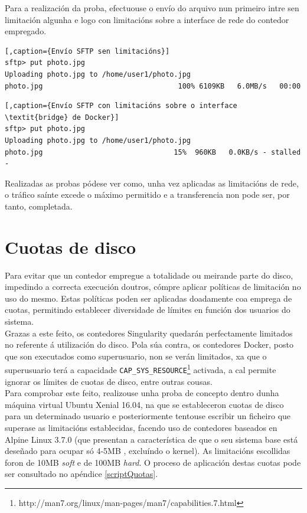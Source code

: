 Para a realización da proba, efectuouse o envío do arquivo nun primeiro intre sen limitación algunha e logo con limitacións sobre a interface de rede do contedor empregado.\\

\begin{lstlisting}[,caption={Envío SFTP sen limitacións}]
sftp> put photo.jpg 
Uploading photo.jpg to /home/user1/photo.jpg
photo.jpg                                100% 6109KB   6.0MB/s   00:00 
\end{lstlisting}

\begin{lstlisting}[,caption={Envío SFTP con limitacións sobre o interface \textit{bridge} de Docker}]
sftp> put photo.jpg
Uploading photo.jpg to /home/user1/photo.jpg
photo.jpg                               15%  960KB   0.0KB/s - stalled -
\end{lstlisting}

Realizadas as probas pódese ver como, unha vez aplicadas as limitacións de rede, o tráfico saínte excede o máximo permitido e a transferencia non pode ser, por tanto, completada.

\section{Cuotas de disco}
\label{quotas}

Para evitar que un contedor empregue a totalidade ou meirande parte do disco, impedindo a correcta execución doutros, cómpre aplicar políticas de limitación no uso do mesmo. Estas políticas poden ser aplicadas doadamente coa emprega de cuotas, permitindo establecer diversidade de límites en función dos usuarios do sistema.\\

Grazas a este feito, os contedores Singularity quedarán perfectamente limitados no referente á utilización do disco. Pola súa contra, os contedores Docker, posto que son executados como superusuario, non se verán limitados, xa que o superusuario terá a capacidade {\tt CAP\_SYS\_RESOURCE}\footnote{http://man7.org/linux/man-pages/man7/capabilities.7.html} activada, a cal permite ignorar os límites de cuotas de disco, entre outras cousas.\\

Para comprobar este feito, realizouse unha proba de concepto dentro dunha máquina virtual Ubuntu Xenial 16.04, na que se estableceron cuotas de disco para un determinado usuario e posteriormente tentouse escribir un ficheiro que superase as limitacións establecidas, facendo uso de contedores baseados en Alpine Linux 3.7.0 (que presentan a característica de que o seu sistema base está deseñado para ocupar só 4-5MB , excluíndo o kernel). As limitacións escollidas foron de 10MB \textit{soft} e de 100MB \textit{hard}. O proceso de aplicación destas cuotas pode ser consultado no apéndice \ref{scriptQuotas}.

